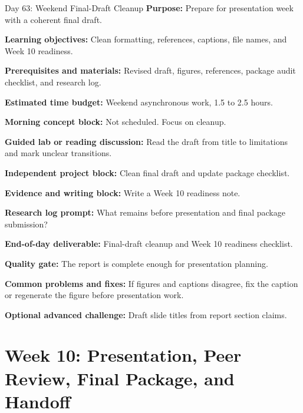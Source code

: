 \begin{dailybox}{Day 63: Weekend Final-Draft Cleanup}
\textbf{Purpose:} Prepare for presentation week with a coherent final draft.

\textbf{Learning objectives:} Clean formatting, references, captions, file names, and Week 10 readiness.

\textbf{Prerequisites and materials:} Revised draft, figures, references, package audit checklist, and research log.

\textbf{Estimated time budget:} Weekend asynchronous work, 1.5 to 2.5 hours.

\textbf{Morning concept block:} Not scheduled. Focus on cleanup.

\textbf{Guided lab or reading discussion:} Read the draft from title to limitations and mark unclear transitions.

\textbf{Independent project block:} Clean final draft and update package checklist.

\textbf{Evidence and writing block:} Write a Week 10 readiness note.

\textbf{Research log prompt:} What remains before presentation and final package submission?

\textbf{End-of-day deliverable:} Final-draft cleanup and Week 10 readiness checklist.

\textbf{Quality gate:} The report is complete enough for presentation planning.

\textbf{Common problems and fixes:} If figures and captions disagree, fix the caption or regenerate the figure before presentation work.

\textbf{Optional advanced challenge:} Draft slide titles from report section claims.
\end{dailybox}

\section{Week 10: Presentation, Peer Review, Final Package, and Handoff}

